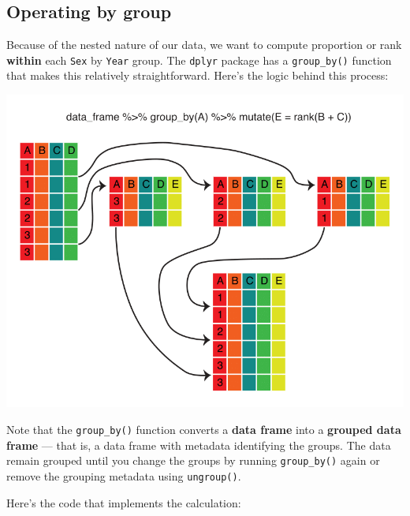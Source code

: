 \documentclass[
]{book}
\newenvironment{Shaded}{\begin{snugshade}}{\end{snugshade}}
\newcommand{\DataTypeTok}[1]{\textcolor[rgb]{0.13,0.29,0.53}{#1}}
\newcommand{\KeywordTok}[1]{\textcolor[rgb]{0.13,0.29,0.53}{\textbf{#1}}}
\newcommand{\NormalTok}[1]{#1}
\newcommand{\OperatorTok}[1]{\textcolor[rgb]{0.81,0.36,0.00}{\textbf{#1}}}
\newcommand{\StringTok}[1]{\textcolor[rgb]{0.31,0.60,0.02}{#1}}
\begin{document}
\hypertarget{operating-by-group}{%
\subsection{Operating by group}\label{operating-by-group}}

Because of the nested nature of our data, we want to compute proportion
or rank \textbf{within} each \texttt{Sex} by \texttt{Year} group. The \texttt{dplyr}
package has a \texttt{group\_by()} function that makes this relatively
straightforward. Here's the logic behind this process:

\includegraphics{R/Rintro/images/mutate_group_by.png}

Note that the \texttt{group\_by()} function converts a \textbf{data frame} into a
\textbf{grouped data frame} --- that is, a data frame with metadata identifying
the groups. The data remain grouped until you change the groups by
running \texttt{group\_by()} again or remove the grouping metadata using
\texttt{ungroup()}.

Here's the code that implements the calculation:

\begin{Shaded}
\end{Shaded}
\end{document}
